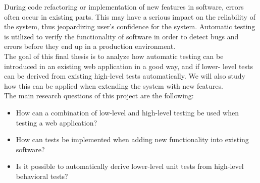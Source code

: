 

During code refactoring or implementation of new features in software,
errors often occur in existing parts. This may have a serious impact on
the reliability of the system, thus jeopardizing user's confidence for
the system. Automatic testing is utilized to verify the functionality of
software in order to detect bugs and errors before they end up in a
production environment.\\

The goal of this final thesis is to analyze how automatic testing can be
introduced in an existing web application in a good way, and if lower-
level tests can be derived from existing high-level tests automatically.
We will also study how this can be applied when extending the system
with new features.\\

The main research questions of this project are the following:

\begin{itemize}
    \item How can a combination of low-level and high-level testing be
          used when testing a web application?
    \item How can tests be implemented when adding new functionality
          into existing software?
    \item Is it possible to automatically derive lower-level unit tests
          from high-level behavioral tests?
\end{itemize}



